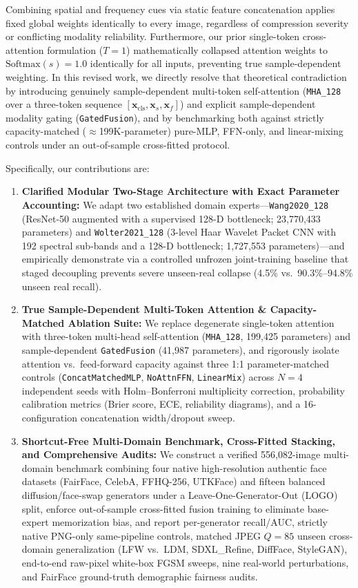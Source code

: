 \documentclass[fleqn,10pt]{wlscirep}
\begin{document}
Combining spatial and frequency cues via static feature concatenation applies fixed global weights identically to every image, regardless of compression severity or conflicting modality reliability. Furthermore, our prior single-token cross-attention formulation ($T=1$) mathematically collapsed attention weights to $\text{Softmax}(s)=1.0$ identically for all inputs, preventing true sample-dependent weighting. In this revised work, we directly resolve that theoretical contradiction by introducing genuinely sample-dependent multi-token self-attention (\texttt{MHA\_128} over a three-token sequence $[\mathbf{x}_{\text{cls}}, \mathbf{x}_s, \mathbf{x}_f]$) and explicit sample-dependent modality gating (\texttt{GatedFusion}), and by benchmarking both against strictly capacity-matched ($\approx$199K-parameter) pure-MLP, FFN-only, and linear-mixing controls under an out-of-sample cross-fitted protocol.

Specifically, our contributions are:
\begin{enumerate}
    \item \textbf{Clarified Modular Two-Stage Architecture with Exact Parameter Accounting:} We adapt two established domain experts---\texttt{Wang2020\_128} (ResNet-50 \cite{ref4} augmented with a supervised 128-D bottleneck; 23,770,433 parameters) and \texttt{Wolter2021\_128} (3-level Haar Wavelet Packet CNN \cite{ref8} with 192 spectral sub-bands and a 128-D bottleneck; 1,727,553 parameters)---and empirically demonstrate via a controlled unfrozen joint-training baseline that staged decoupling prevents severe unseen-real collapse (4.5\% vs.\ 90.3\%--94.8\% unseen real recall).
    \item \textbf{True Sample-Dependent Multi-Token Attention \& Capacity-Matched Ablation Suite:} We replace degenerate single-token attention with three-token multi-head self-attention (\texttt{MHA\_128}, 199,425 parameters) and sample-dependent \texttt{GatedFusion} (41,987 parameters), and rigorously isolate attention vs.\ feed-forward capacity against three 1:1 parameter-matched controls (\texttt{ConcatMatchedMLP}, \texttt{NoAttnFFN}, \texttt{LinearMix}) across $N=4$ independent seeds with Holm--Bonferroni multiplicity correction, probability calibration metrics (Brier score, ECE, reliability diagrams), and a 16-configuration concatenation width/dropout sweep.
    \item \textbf{Shortcut-Free Multi-Domain Benchmark, Cross-Fitted Stacking, and Comprehensive Audits:} We construct a verified 556,082-image multi-domain benchmark combining four native high-resolution authentic face datasets (FairFace, CelebA, FFHQ-256, UTKFace) and fifteen balanced diffusion/face-swap generators under a Leave-One-Generator-Out (LOGO) split, enforce out-of-sample cross-fitted fusion training to eliminate base-expert memorization bias, and report per-generator recall/AUC, strictly native PNG-only same-pipeline controls, matched JPEG $Q=85$ unseen cross-domain generalization (LFW vs.\ LDM, SDXL\_Refine, DiffFace, StyleGAN), end-to-end raw-pixel white-box FGSM sweeps, nine real-world perturbations, and FairFace ground-truth demographic fairness audits.
\end{enumerate}
\end{document}
